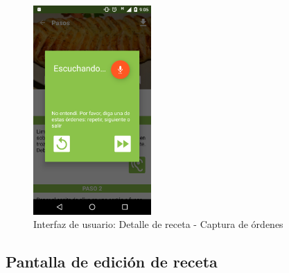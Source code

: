 \begin{enumerate}
  \begin{figure}[htbp]
    \centering
    \includegraphics[width=0.4\textwidth]{cap5/img/captura_19}
    \caption{Interfaz de usuario: Detalle de receta - Captura de órdenes}
    \label{fig:captura_19}
  \end{figure}

\end{enumerate}



\subsection{Pantalla de edición de receta}


